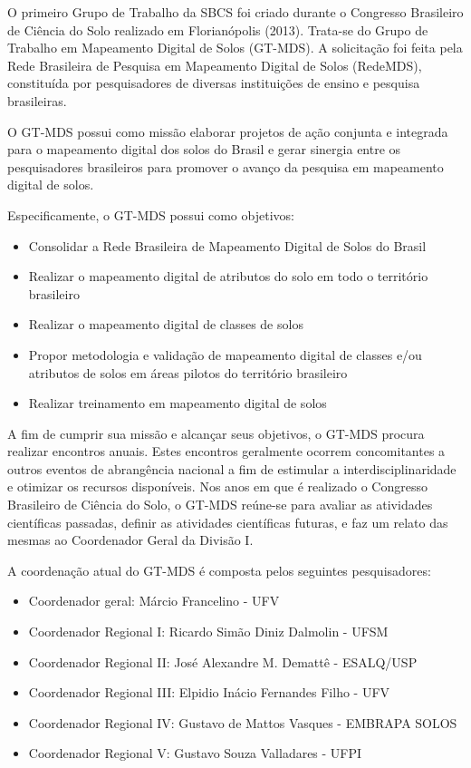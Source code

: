 O primeiro Grupo de Trabalho da SBCS foi criado durante o Congresso Brasileiro de Ciência do Solo realizado em Florianópolis (2013). Trata-se do Grupo de Trabalho em Mapeamento Digital de Solos (GT-MDS). A solicitação foi feita pela Rede Brasileira de Pesquisa em Mapeamento Digital de Solos (RedeMDS), constituída por pesquisadores de diversas instituições de ensino e pesquisa brasileiras.

O GT-MDS possui como missão elaborar projetos de ação conjunta e integrada para o mapeamento digital dos solos do Brasil e gerar sinergia entre os pesquisadores brasileiros para promover o avanço da pesquisa em mapeamento digital de solos.

Especificamente, o GT-MDS possui como objetivos:

\begin{itemize}
 \item Consolidar a Rede Brasileira de Mapeamento Digital de Solos do Brasil
 \item Realizar o mapeamento digital de atributos do solo em todo o território brasileiro
 \item Realizar o mapeamento digital de classes de solos
 \item Propor metodologia e validação de mapeamento digital de classes e/ou atributos de solos em áreas pilotos do território brasileiro
 \item Realizar treinamento em mapeamento digital de solos
\end{itemize}

A fim de cumprir sua missão e alcançar seus objetivos, o GT-MDS procura realizar encontros anuais. Estes encontros geralmente ocorrem concomitantes a outros eventos de abrangência nacional a fim de estimular a interdisciplinaridade e otimizar os recursos disponíveis. Nos anos em que é realizado o Congresso Brasileiro de Ciência do Solo, o GT-MDS reúne-se para avaliar as atividades científicas passadas, definir as atividades científicas futuras, e faz um relato das mesmas ao Coordenador Geral da Divisão I.

A coordenação atual do GT-MDS é composta pelos seguintes pesquisadores:

\begin{itemize}
 \item Coordenador geral: Márcio Francelino - UFV
 \item Coordenador Regional I: Ricardo Simão Diniz Dalmolin - UFSM
 \item Coordenador Regional II: José Alexandre M. Demattê - ESALQ/USP
 \item Coordenador Regional III: Elpidio Inácio Fernandes Filho - UFV
 \item Coordenador Regional IV: Gustavo de Mattos Vasques - EMBRAPA SOLOS
 \item Coordenador Regional V: Gustavo Souza Valladares - UFPI
\end{itemize}
